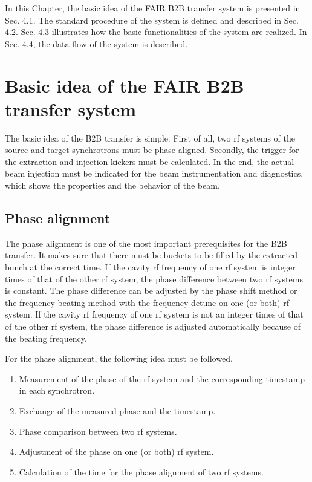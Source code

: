 

In this Chapter, the basic idea of the FAIR B2B transfer system is presented in Sec. 4.1. The standard procedure of the system is defined and described in Sec. 4.2. Sec. 4.3 illustrates how the basic functionalities of the system are realized. In Sec. 4.4, the data flow of the system is described. 

\section{Basic idea of the FAIR B2B transfer system} 
The basic idea of the B2B transfer is simple. First of all, two rf systems of the source and target synchrotrons must be phase aligned. Secondly, the trigger for the extraction and injection kickers must be calculated. In the end, the actual beam injection must be indicated for the beam instrumentation and diagnostics, which shows the properties and the behavior of the beam. 

\subsection{Phase alignment}
The phase alignment is one of the most important prerequisites for the B2B transfer. It makes sure that there must be buckets to be filled by the extracted bunch at the correct time. If the cavity rf frequency of one rf system is integer times of that of the other rf system, the phase difference between two rf systems is constant. The phase difference can be adjusted by the phase shift method or the frequency beating method with the frequency detune on one (or both) rf system. If the cavity rf frequency of one rf system is not an integer times of that of the other rf system, the phase difference is adjusted automatically because of the beating frequency. %

For the phase alignment, the following idea must be followed. 
\begin{enumerate}
\item Measurement of the phase of the rf system and the corresponding timestamp in each synchrotron.
\item Exchange of the measured phase and the timestamp.
\item Phase comparison between two rf systems.
\item Adjustment of the phase on one (or both) rf system. 
\item Calculation of the time for the phase alignment of two rf systems.
\end{enumerate}

